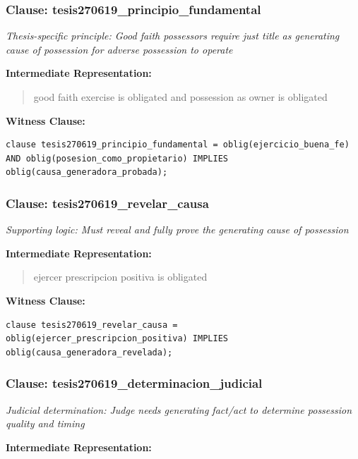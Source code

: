 \documentclass[11pt,a4paper]{article}
\begin{document}
\subsubsection{Clause: tesis270619\_principio\_fundamental}

\textit{Thesis-specific principle: Good faith possessors require just title as generating cause of possession for adverse possession to operate}

\textbf{Intermediate Representation:}

\begin{quote}
good faith exercise is obligated and possession as owner is obligated
\end{quote}

\textbf{Witness Clause:}

\begin{lstlisting}[style=witnessstyle, language=Witness]
clause tesis270619_principio_fundamental = oblig(ejercicio_buena_fe) AND oblig(posesion_como_propietario) IMPLIES oblig(causa_generadora_probada);
\end{lstlisting}

\subsubsection{Clause: tesis270619\_revelar\_causa}

\textit{Supporting logic: Must reveal and fully prove the generating cause of possession}

\textbf{Intermediate Representation:}

\begin{quote}
ejercer prescripcion positiva is obligated
\end{quote}

\textbf{Witness Clause:}

\begin{lstlisting}[style=witnessstyle, language=Witness]
clause tesis270619_revelar_causa = oblig(ejercer_prescripcion_positiva) IMPLIES oblig(causa_generadora_revelada);
\end{lstlisting}

\subsubsection{Clause: tesis270619\_determinacion\_judicial}

\textit{Judicial determination: Judge needs generating fact/act to determine possession quality and timing}

\textbf{Intermediate Representation:}
\end{document}
